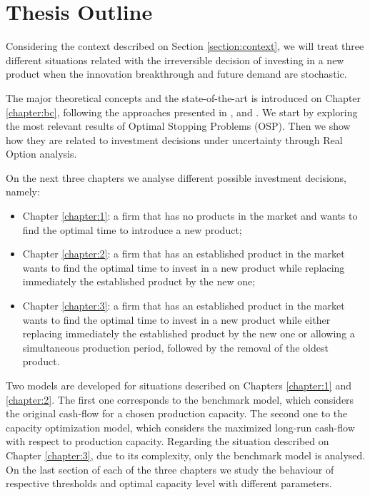 \section{Thesis Outline}
\label{section:outline}

Considering the context described on Section \ref{section:context}, we will treat three different situations related with the irreversible decision of investing in a new product when the innovation breakthrough and future demand are stochastic.


The major theoretical concepts and the state-of-the-art is introduced on Chapter \ref{chapter:bc}, following the approaches presented in \cite{dixit:book}, \cite{ross} and \cite{oksendal:book}.
We start by exploring the most relevant results of Optimal Stopping Problems (OSP). Then we show how they are related to investment decisions under uncertainty through Real Option analysis.

On the next three chapters we analyse different possible investment decisions, namely:
\begin{itemize}
	\item Chapter \ref{chapter:1}: a firm that has no products in the market and wants to find the optimal time to introduce a new product;
	\item Chapter \ref{chapter:2}: a firm that has an established product in the market wants to find the optimal time to invest in a new product while replacing immediately the established product by the new one;
	\item Chapter \ref{chapter:3}: a firm that has an established product in the market wants to find the optimal time to invest in a new product while either replacing immediately the established product by the new one or allowing a simultaneous production period, followed by the removal of the oldest product.
\end{itemize}

Two models are developed for situations described on Chapters \ref{chapter:1} and \ref{chapter:2}. The first one corresponds to the benchmark model, which considers the original cash-flow for a chosen production capacity. The second one to the capacity optimization model, which considers the maximized long-run cash-flow with respect to production capacity. 
Regarding the situation described on Chapter \ref{chapter:3}, due to its complexity, only the benchmark model is analysed.
On the last section of each of the three chapters we study the behaviour of respective thresholds and optimal capacity level with different parameters.


